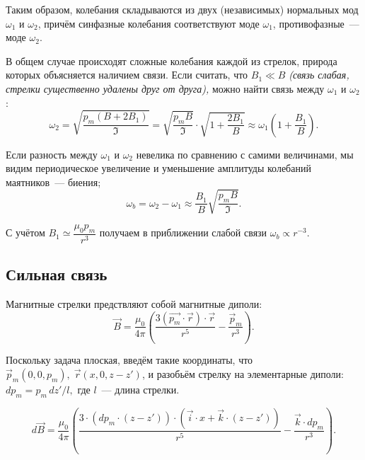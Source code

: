 \documentclass{letask}
\begin{document}
Таким образом, колебания складываются из двух (независимых) нормальных мод $\omega_1$ и $\omega_2$, причём синфазные колебания соответствуют моде $\omega_1$, противофазные~--- моде $\omega_2$.

В общем случае происходят сложные колебания каждой из стрелок, природа которых объясняется наличием связи. Если считать, что $B_1 \ll B$ \emph{(связь слабая, стрелки существенно удалены друг от друга),} можно найти связь между $\omega_1$ и $\omega_2$:
\begin{equation}
\omega_2 = \sqrt{\dfrac{p_m(B+2B_1)}{\mathfrak{I}}} = \sqrt{\dfrac{p_m B}{\mathfrak{I}}} \cdot \sqrt{1+\dfrac{2B_1}{B}} \approx \omega_1 \left( 1+\dfrac{B_1}{B} \right).
\end{equation}

Если разность между $\omega_1$ и $\omega_2$ невелика по сравнению с самими величинами, мы видим периодическое увеличение и уменьшение амплитуды колебаний маятников~--- биения;
\begin{equation}
\omega_b = \omega_2 - \omega_1 \approx \dfrac{B_1}{B} \sqrt{\dfrac{p_m B}{\mathfrak{I}}}.
\end{equation}

С учётом $B_1 \simeq \dfrac{\mu_0 p_m}{r^3}$ получаем в приближении слабой связи $\omega_b \propto r^{-3}$.

\subsection{Сильная связь}

Магнитные стрелки предствляют собой магнитные диполи:
\begin{equation}
\vec{B} = \dfrac{\mu_0}{4 \pi} \left(\dfrac{3(\vec{p_m} \cdot\vec{r}) \cdot \vec{r}}{r^5} - \dfrac{\vec p_m}{r^3}\right).
\end{equation}

Поскольку задача плоская, введём такие координаты, что $\vec p_m (0, 0, p_m), \; \vec r (x, 0, z-z')$, и разобьём стрелку на элементарные диполи: $dp_m = p_m \, dz'/l,$ где $l$~--- длина стрелки.

\begin{equation}
d \vec{B} = \dfrac{\mu_0}{4 \pi}
	\left(
		\dfrac{3 \cdot
			\left(dp_m \cdot (z-z') \right)
			\cdot
			\left( \vec{i} \cdot x + \vec{k} \cdot (z-z') \right)
		}{r^5}
	- \dfrac{\vec{k} \cdot dp_m}{r^3}
	\right).
\end{equation}
\end{document}
